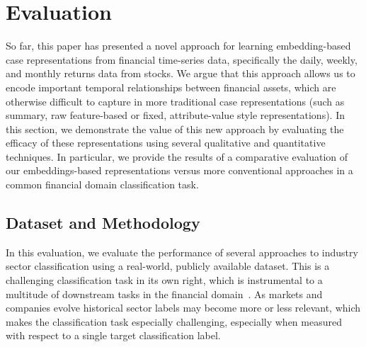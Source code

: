 \documentclass[runningheads]{llncs}
\begin{document}




\section{Evaluation}\label{sec:evaluation}
So far, this paper has presented a novel approach for learning embedding-based case representations from financial time-series data, specifically the daily, weekly, and monthly returns data from stocks. We argue that this approach allows us to encode important temporal relationships between financial assets, which are otherwise difficult to capture in more traditional case representations (such as summary, raw feature-based or fixed, attribute-value style representations). In this section, we demonstrate the value of this new approach by evaluating the efficacy of these representations using several qualitative and quantitative techniques. In particular, we provide the results of a comparative evaluation of our embeddings-based representations versus more conventional approaches in a common financial domain classification task.

\subsection{Dataset and Methodology}
In this evaluation, we evaluate the performance of several approaches to industry sector classification using a real-world, publicly available dataset. This is a challenging classification task in its own right, which is instrumental to a multitude of downstream tasks in the financial domain~\cite{phillips2016industry}. As markets and companies evolve historical sector labels may become more or less relevant, which makes the classification task especially challenging, especially when measured with respect to a single target classification label.
\end{document}
